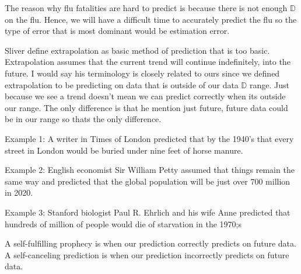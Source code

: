 \documentclass[12pt]{article}
\begin{document}
\begin{enumerate}


The reason why flu fatalities are hard to predict is because there is not enough $\mathbb{D}$ on the flu. Hence, we will have a difficult time to accurately predict the flu so the type of error that is most dominant would be estimation error.   


Sliver define extrapolation as basic method of prediction that is too basic. Extrapolation assumes that the current trend will continue indefinitely, into the future.  I would say his terminology is closely related to ours since we defined extrapolation to be predicting on data that is outside of our data $\mathbb{D}$ range. Just because we see a trend doesn't mean we can predict correctly when its outside our range. The only difference is that he mention just future, future data could be in our range so thats the only difference.  


Example 1: A writer in Times of London predicted that by the 1940's that every street in London would be buried under nine feet of horse manure.  

Example 2: English economist Sir William Petty assumed that things remain the same way and predicted that the global population will be just over 700 million in 2020. 

Example 3: Stanford biologist Paul R. Ehrlich and his wife Anne predicted that hundreds of million of people would die of starvation in the 1970;s 



A self-fulfilling prophecy is when our prediction  correctly predicts on future data. \\
A self-canceling prediction is when our prediction  incorrectly predicts on future data.



\end{enumerate}
\end{document}

